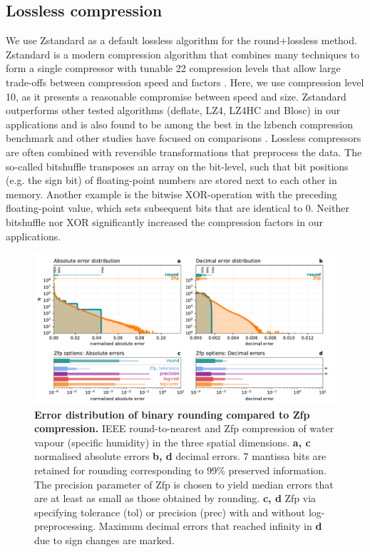 \subsection{Lossless compression}

We use Zstandard as a default lossless algorithm for the round+lossless method. Zstandard is a modern compression algorithm
that combines many techniques to form a single compressor with tunable 22 compression levels that allow large trade-offs between
compression speed and factors \citep{Skibinski2020,Collet2020}. Here, we use compression level 10, as it presents a reasonable
compromise between speed and size. Zstandard outperforms other tested algorithms (deflate, LZ4, LZ4HC and Blosc) in our
applications and is also found to be among the best in the lzbench compression benchmark \citep{Skibinski2020} and other studies
have focused on comparisons \citep{Delaunay2019}. Lossless compressors
are often combined with reversible transformations that preprocess the data. The so-called bitshuffle transposes an array on the
bit-level, such that bit positions (e.g. the sign bit) of floating-point numbers are stored next to each other in memory. Another example
is the bitwise XOR-operation \citep{Pelkonen2015} with the preceding floating-point value, which sets subsequent bits that are identical
to 0. Neither bitshuffle nor XOR significantly increased the compression factors in our applications.

\begin{figure}[tbhp]
	\includegraphics[width=1\textwidth]{Figures/compression/error_distributions.pdf}
	\caption{\textbf{Error distribution of binary rounding compared to Zfp compression.} 
	IEEE round-to-nearest and Zfp compression of water vapour (specific humidity) in the
	three spatial dimensions. \textbf{a, c} normalised absolute errors \textbf{b, d} decimal errors.
	7 mantissa bits are retained for rounding corresponding to 99\% preserved information.
	The precision parameter of Zfp is chosen to yield median errors that are at least as small
	as those obtained by rounding. \textbf{c, d} Zfp via specifying tolerance (tol) or precision (prec)
	with and without log-preprocessing. Maximum decimal errors that reached infinity in \textbf{d}
	due to sign changes are marked.}
	\label{fig:compression_error_distribution}
\end{figure}

